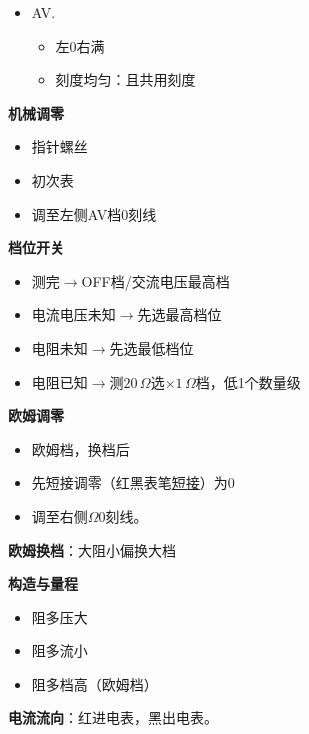\begin{itemize}
\item AV.
  \begin{itemize}
  \item 左$0$右满
  \item 刻度均匀：且共用刻度
  \end{itemize}
\end{itemize}
\textbf{机械调零}
\begin{itemize}
\item 指针螺丝
\item 初次表
\item 调至左侧AV档0刻线
\end{itemize}

\textbf{档位开关}
\begin{itemize}
\item 测完$\to$OFF档/交流电压最高档
\item 电流电压未知$\to$先选最高档位
\item 电阻未知$\to$先选最低档位
\item 电阻已知$\to$测$20\,\Omega$选$\times1\,\Omega$档，低1个数量级
\end{itemize}

\textbf{欧姆调零}
\begin{itemize}
\item 欧姆档，换档后
\item 先短接调零（红黑表笔\underline{短接}）为0
\item 调至右侧$\Omega$0刻线。
\end{itemize}
\textbf{欧姆换档}：大阻小偏换大档

\textbf{构造与量程}
\begin{itemize}
\item 阻多压大
\item 阻多流小
\item 阻多档高（欧姆档）
\end{itemize}
\textbf{电流流向}：红进电表，黑出电表。


